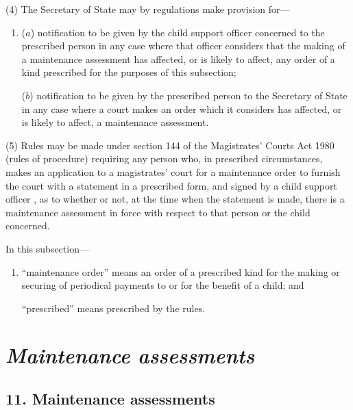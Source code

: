 \documentclass[12pt,a4paper]{article}
\begin{document}
(4) The Secretary of State may by regulations make provision for—
\begin{enumerate}\item[]
($a$) notification to be given by 
the child support officer concerned 
to the prescribed person in any case where 
that officer 
considers that the making of a maintenance assessment has affected, or is likely to affect, any order of a kind prescribed for the purposes of this subsection;

($b$) notification to be given by the prescribed person to the Secretary of State in any case where a court makes an order which it considers has affected, or is likely to affect, a maintenance assessment.
\end{enumerate}

(5) Rules may be made under section 144 of the Magistrates' Courts Act 1980 (rules of procedure) requiring any person who, in prescribed circumstances, makes an application to a magistrates' court for a maintenance order to furnish the court with a statement in a prescribed form, and signed by 
a child support officer%
, as to whether or not, at the time when the statement is made, there is a maintenance assessment in force with respect to that person or the child concerned.

In this subsection—
\begin{enumerate}\item[]
    “maintenance order” means an order of a prescribed kind for the making or securing of periodical payments to or for the benefit of a child; and

    “prescribed” means prescribed by the rules. 
\end{enumerate}


\section{\itshape Maintenance assessments}

\subsection{11. Maintenance assessments}
\end{document}
